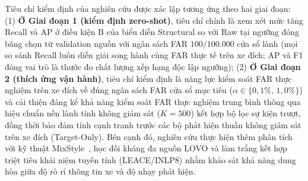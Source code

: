 \documentclass[12pt, a4paper, reqno, oneside]{book}
\begin{document}
Tiêu chí kiểm định của nghiên cứu được xác lập tương ứng theo hai giai đoạn: (1) \textbf{Ở Giai đoạn 1 (kiểm định zero-shot)}, tiêu chí chính là xem xét mức tăng Recall và AP ở điều kiện B của biểu diễn Structural so với Raw tại ngưỡng đóng băng chọn từ validation nguồn với ngân sách FAR $100/100.000$ cửa sổ lành (mọi so sánh Recall luôn diễn giải song hành cùng FAR thực tế trên xe đích; AP và F1 đóng vai trò là thước đo chất lượng xếp hạng độc lập ngưỡng); (2) \textbf{Ở Giai đoạn 2 (thích ứng vận hành)}, tiêu chí kiểm định là năng lực kiểm soát FAR thực nghiệm trên xe đích về đúng ngân sách FAR cửa sổ mục tiêu ($\alpha \in \{0{,}1\%,\, 1{,}0\%\}$) và cải thiện đáng kể khả năng kiểm soát FAR thực nghiệm trung bình thông qua hiệu chuẩn nền lành tính không giám sát ($K=500$) kết hợp bộ lọc sự kiện trượt, đồng thời bảo đảm tính cạnh tranh trước các bộ phát hiện thuần không giám sát trên xe đích (Target-Only). Bên cạnh đó, nghiên cứu thực hiện thêm phân tích với kỹ thuật MixStyle~\cite{zhou2021mixstyle}, học đối kháng đa nguồn LOVO và làm trắng kết hợp triệt tiêu khái niệm tuyến tính (LEACE/INLP8) nhằm khảo sát khả năng dung hòa giữa độ rò rỉ thông tin xe và độ nhạy phát hiện.
\end{document}
